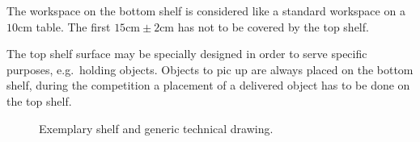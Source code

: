 The workspace on the bottom shelf is considered like a standard workspace on a $10\si{\centi\meter}$ table. The first $15 \si{\centi\meter}\pm 2\si{\centi\meter} $ has not to be covered by the top shelf. 

The top shelf surface may be specially designed in order to serve specific purposes, e.g.\, holding objects. Objects to pic up are always placed on the bottom shelf, during the competition a placement of a delivered object has to be done on the top shelf.  

\begin{figure}[h!]
\centering
{}
\hspace{0.5cm}
\caption{Exemplary shelf and generic technical drawing.}%
\label{fig:shelf}
\end{figure}


